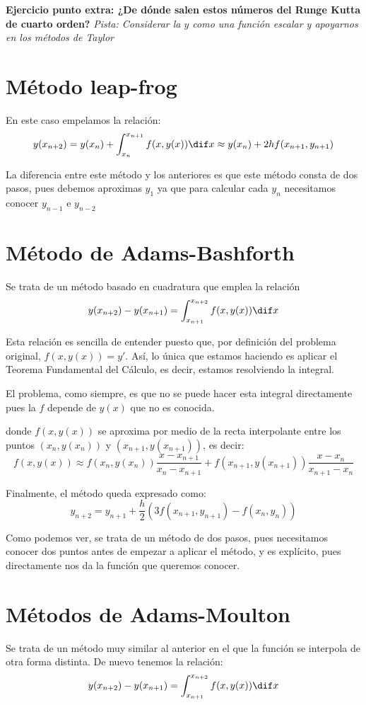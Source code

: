 \documentclass{apuntes}
\begin{document}
\textbf{Ejercicio punto extra: ¿De dónde salen estos números del Runge Kutta de cuarto orden?}
\textit{Pista: Considerar la $y$ como una función escalar y apoyarnos en los métodos de Taylor}

\section{Método leap-frog}
En este caso empelamos la relación:
\[y(x_{n+2}) = y(x_n) + \int_{x_n}^{x_{n+1}} f(x,y(x)) \dif x \approx y(x_n) + 2h f(x_{n+1},y_{n+1})\]

La diferencia entre este método y los anteriores es que este método consta de dos pasos, pues debemos aproximas $y_1$ ya que para calcular cada $y_n$ necesitamos conocer $y_{n-1}$ e $y_{n-2}$

\section{Método de Adams-Bashforth}

Se trata de un método basado en cuadratura que emplea la relación
\[y(x_{n+2}) - y(x_{n+1}) = \int_{x_{n+1}}^{x_{n+2}} f(x,y(x)) \dif x\]

\begin{remark}
Esta relación es sencilla de entender puesto que, por definición del problema original, $f(x,y(x))=y'$. Así, lo única que estamos haciendo es aplicar el Teorema Fundamental del Cálculo, es decir, estamos resolviendo la integral.

El problema, como siempre, es que no se puede hacer esta integral directamente pues la $f$ depende de $y(x)$ que no es conocida.
\end{remark}

donde $f(x,y(x))$ se aproxima por medio de la recta interpolante entre los puntos $(x_n,y(x_n))$ y $(x_{n+1},y(x_{n+1}))$, es decir:
\[f(x,y(x)) \approx f(x_n, y(x_n)) \frac{x-x_{n+1}}{x_n-x_{n+1}}+f(x_{n+1},y(x_{n+1}))\frac{x-x_n}{x_{n+1}-x_n}\]

Finalmente, el método queda expresado como:
\[y_{n+2} = y_{n+1}+\frac{h}{2}\left( 3f(x_{n+1},y_{n+1})-f(x_n,y_n)\right)\]

Como podemos ver, se trata de un método de dos pasos, pues necesitamos conocer dos puntos antes de empezar a aplicar el método, y es explícito, pues directamente nos da la función que queremos conocer.

\section{Métodos de Adams-Moulton}
Se trata de un método muy similar al anterior en el que la función se interpola de otra forma distinta. De nuevo tenemos la relación:
\[y(x_{n+2}) - y(x_{n+1}) = \int_{x_{n+1}}^{x_{n+2}} f(x,y(x)) \dif x\]
\end{document}
